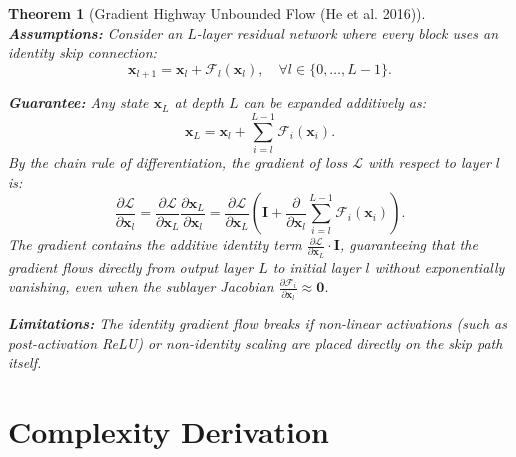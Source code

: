 \documentclass[11pt]{article}
\newtheorem{theorem}{Theorem}
\begin{document}
\begin{theorem}[Gradient Highway Unbounded Flow (He et al. 2016)]
\label{thm:gradient_highway}
\textbf{Assumptions:}
Consider an $L$-layer residual network where every block uses an identity skip connection:
\begin{equation}
\mathbf{x}_{l+1} = \mathbf{x}_l + \mathcal{F}_l(\mathbf{x}_l), \quad \forall l \in \{0, \dots, L-1\}.
\end{equation}

\textbf{Guarantee:}
Any state $\mathbf{x}_L$ at depth $L$ can be expanded additively as:
\begin{equation}
\label{eq:additive_expansion}
\mathbf{x}_L = \mathbf{x}_l + \sum_{i=l}^{L-1} \mathcal{F}_i(\mathbf{x}_i).
\end{equation}
By the chain rule of differentiation, the gradient of loss $\mathcal{L}$ with respect to layer $l$ is:
\begin{equation}
\label{eq:highway_grad}
\frac{\partial \mathcal{L}}{\partial \mathbf{x}_l} = \frac{\partial \mathcal{L}}{\partial \mathbf{x}_L} \frac{\partial \mathbf{x}_L}{\partial \mathbf{x}_l} = \frac{\partial \mathcal{L}}{\partial \mathbf{x}_L} \left( \mathbf{I} + \frac{\partial}{\partial \mathbf{x}_l} \sum_{i=l}^{L-1} \mathcal{F}_i(\mathbf{x}_i) \right).
\end{equation}
The gradient contains the additive identity term $\frac{\partial \mathcal{L}}{\partial \mathbf{x}_L} \cdot \mathbf{I}$, guaranteeing that the gradient flows directly from output layer $L$ to initial layer $l$ without exponentially vanishing, even when the sublayer Jacobian $\frac{\partial \mathcal{F}_i}{\partial \mathbf{x}_l} \approx \mathbf{0}$.

\textbf{Limitations:}
The identity gradient flow breaks if non-linear activations (such as post-activation ReLU) or non-identity scaling are placed directly on the skip path itself.
\end{theorem}

\section{Complexity Derivation}
\label{sec:complexity}
\end{document}
